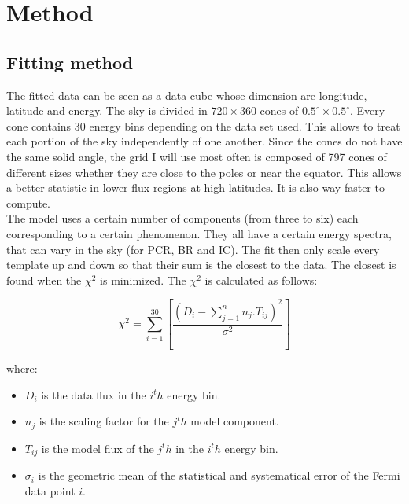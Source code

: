 \chapter{Method}
\label{ch:method}


%

\section{Fitting method}

The fitted data can be seen as a data cube whose dimension are longitude, latitude and energy. The sky is divided in $720\times360$ cones of $ 0.5^\circ \times 0.5^\circ $. Every cone contains 30 energy bins depending on the data set used. This allows to treat each portion of the sky independently of one another. Since the cones do not have the same solid angle, the grid I will use most often is composed of 797 cones of different sizes whether they are close to the poles or near the equator. This allows a better statistic in lower flux regions at high latitudes. It is also way faster to compute. \\

The model uses a certain number of components (from three to six) each corresponding to a certain phenomenon. They all have a certain energy spectra, that can vary in the sky (for PCR, BR and IC). The fit then only scale every template up and down so that their sum is the closest to the data. The closest is found when the $\chi ^2$ is minimized. The $\chi ^2$ is calculated as follows:

\begin{equation}
\chi ^2 = \sum_{i=1}^{30}[\frac{(D_i - \sum_{j=1}^{n}n_j.T_{ij})^2}{\sigma^2}]
\end{equation}

where:
\begin{itemize}
\item $D_i$ is the data flux in the $i^th$ energy bin.
\item $n_j$ is the scaling factor for the $j^th$ model component.
\item $T_{ij}$ is the model flux of the $j^th$ in the $i^th$ energy bin.
\item $\sigma_i$ is the geometric mean of the statistical and systematical error of the Fermi data point $i$.
\end{itemize}


